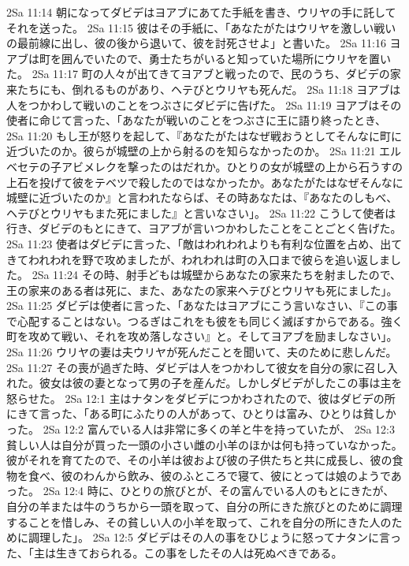 2Sa 11:14  朝になってダビデはヨアブにあてた手紙を書き、ウリヤの手に託してそれを送った。
2Sa 11:15  彼はその手紙に、「あなたがたはウリヤを激しい戦いの最前線に出し、彼の後から退いて、彼を討死させよ」と書いた。
2Sa 11:16  ヨアブは町を囲んでいたので、勇士たちがいると知っていた場所にウリヤを置いた。
2Sa 11:17  町の人々が出てきてヨアブと戦ったので、民のうち、ダビデの家来たちにも、倒れるものがあり、ヘテびとウリヤも死んだ。
2Sa 11:18  ヨアブは人をつかわして戦いのことをつぶさにダビデに告げた。
2Sa 11:19  ヨアブはその使者に命じて言った、「あなたが戦いのことをつぶさに王に語り終ったとき、
2Sa 11:20  もし王が怒りを起して、『あなたがたはなぜ戦おうとしてそんなに町に近づいたのか。彼らが城壁の上から射るのを知らなかったのか。
2Sa 11:21  エルベセテの子アビメレクを撃ったのはだれか。ひとりの女が城壁の上から石うすの上石を投げて彼をテベツで殺したのではなかったか。あなたがたはなぜそんなに城壁に近づいたのか』と言われたならば、その時あなたは、『あなたのしもべ、ヘテびとウリヤもまた死にました』と言いなさい」。
2Sa 11:22  こうして使者は行き、ダビデのもとにきて、ヨアブが言いつかわしたことをことごとく告げた。
2Sa 11:23  使者はダビデに言った、「敵はわれわれよりも有利な位置を占め、出てきてわれわれを野で攻めましたが、われわれは町の入口まで彼らを追い返しました。
2Sa 11:24  その時、射手どもは城壁からあなたの家来たちを射ましたので、王の家来のある者は死に、また、あなたの家来ヘテびとウリヤも死にました」。
2Sa 11:25  ダビデは使者に言った、「あなたはヨアブにこう言いなさい、『この事で心配することはない。つるぎはこれをも彼をも同じく滅ぼすからである。強く町を攻めて戦い、それを攻め落しなさい』と。そしてヨアブを励ましなさい」。
2Sa 11:26  ウリヤの妻は夫ウリヤが死んだことを聞いて、夫のために悲しんだ。
2Sa 11:27  その喪が過ぎた時、ダビデは人をつかわして彼女を自分の家に召し入れた。彼女は彼の妻となって男の子を産んだ。しかしダビデがしたこの事は主を怒らせた。
2Sa 12:1  主はナタンをダビデにつかわされたので、彼はダビデの所にきて言った、「ある町にふたりの人があって、ひとりは富み、ひとりは貧しかった。
2Sa 12:2  富んでいる人は非常に多くの羊と牛を持っていたが、
2Sa 12:3  貧しい人は自分が買った一頭の小さい雌の小羊のほかは何も持っていなかった。彼がそれを育てたので、その小羊は彼および彼の子供たちと共に成長し、彼の食物を食べ、彼のわんから飲み、彼のふところで寝て、彼にとっては娘のようであった。
2Sa 12:4  時に、ひとりの旅びとが、その富んでいる人のもとにきたが、自分の羊または牛のうちから一頭を取って、自分の所にきた旅びとのために調理することを惜しみ、その貧しい人の小羊を取って、これを自分の所にきた人のために調理した」。
2Sa 12:5  ダビデはその人の事をひじょうに怒ってナタンに言った、「主は生きておられる。この事をしたその人は死ぬべきである。
